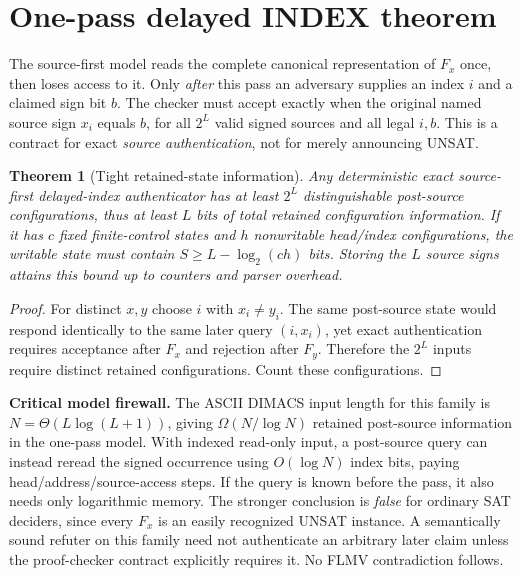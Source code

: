 \documentclass[11pt]{article}
\newtheorem{theorem}{Theorem}
\begin{document}
\section*{One-pass delayed INDEX theorem}
The source-first model reads the complete canonical representation of $F_x$ once, then loses access to it. Only \emph{after} this pass an adversary supplies an index $i$ and a claimed sign bit $b$. The checker must accept exactly when the original named source sign $x_i$ equals $b$, for all $2^L$ valid signed sources and all legal $i,b$. This is a contract for exact \emph{source authentication}, not for merely announcing UNSAT.

\begin{theorem}[Tight retained-state information]
Any deterministic exact source-first delayed-index authenticator has at least $2^L$ distinguishable post-source configurations, thus at least $L$ bits of total retained configuration information. If it has $c$ fixed finite-control states and $h$ nonwritable head/index configurations, the writable state must contain $S\ge L-\log_2(ch)$ bits. Storing the $L$ source signs attains this bound up to counters and parser overhead.
\end{theorem}
\begin{proof}
For distinct $x,y$ choose $i$ with $x_i\ne y_i$. The same post-source state would respond identically to the same later query $(i,x_i)$, yet exact authentication requires acceptance after $F_x$ and rejection after $F_y$. Therefore the $2^L$ inputs require distinct retained configurations. Count these configurations.
\end{proof}

\noindent \textbf{Critical model firewall.} The ASCII DIMACS input length for this family is $N=\Theta(L\log(L+1))$, giving $\Omega(N/\log N)$ retained post-source information in the one-pass model. With indexed read-only input, a post-source query can instead reread the signed occurrence using $O(\log N)$ index bits, paying head/address/source-access steps. If the query is known before the pass, it also needs only logarithmic memory. The stronger conclusion is \emph{false} for ordinary SAT deciders, since every $F_x$ is an easily recognized UNSAT instance. A semantically sound refuter on this family need not authenticate an arbitrary later claim unless the proof-checker contract explicitly requires it. No FLMV contradiction follows.
\end{document}
